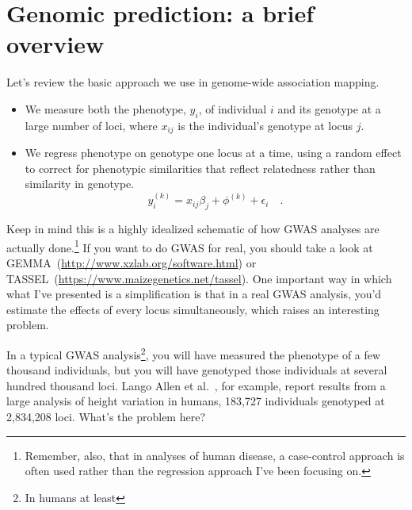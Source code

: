 \chapter{Genomic prediction: a brief overview}

Let's review the basic approach we use in genome-wide association
mapping.

\begin{itemize}

\item We measure both the phenotype, $y_i$, of individual $i$ and its
  genotype at a large number of loci, where $x_{ij}$ is the
  individual's genotype at locus $j$.

\item We regress phenotype on genotype one locus at a time, using a
  random effect to correct for phenotypic similarities that reflect
  relatedness rather than similarity in genotype. 
\[
y_i^{(k)} = x_{ij}\beta_j + \phi^{(k)} + \epsilon_i \quad .
\]

\end{itemize}

Keep in mind this is a highly idealized schematic of how GWAS analyses
are actually done.\footnote{Remember, also, that in analyses of human
  disease, a case-control approach is often used rather than the
  regression approach I've been focusing on.} If you want to do GWAS
for real, you should take a look at
GEMMA~(\url{http://www.xzlab.org/software.html}) or
TASSEL~(\url{https://www.maizegenetics.net/tassel}). One
important way in which what I've presented is a simplification is that
in a real GWAS analysis, you'd estimate the effects of every locus
simultaneously, which raises an interesting problem.

In a typical GWAS analysis\footnote{In humans at least}, you will have
measured the phenotype of a few thousand individuals, but you will
have genotyped those individuals at several hundred thousand
loci. Lango Allen et al.~\cite{LangoAllen-etal-2010}, for example,
report results from a large analysis of height variation in humans,
183,727 individuals genotyped at 2,834,208 loci. What's the problem
here?

